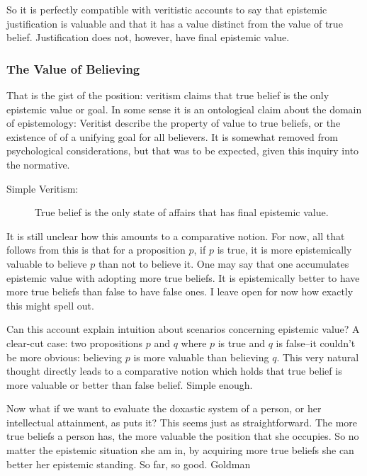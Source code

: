 \documentclass[12pt,numbers=noenddot]{scrartcl}
\begin{document}
So it is perfectly compatible with veritistic accounts to say that epistemic justification is valuable and that it has a value distinct from the value of true belief. Justification does not, however, have final epistemic value.

\subsubsection{The Value of Believing}
That is the gist of the position: veritism claims that true belief is the only epistemic value or goal. In some sense it is an ontological claim about the domain of epistemology: Veritist describe the property of value to true beliefs, or the existence of of a unifying goal for all believers. It is somewhat removed from psychological considerations, but that was to be expected, given this inquiry into the normative.

\begin{description}
    \item[Simple Veritism:] True belief is the only state of affairs that has final epistemic value.
\end{description}

It is still unclear how this amounts to a comparative notion. For now, all that follows from this is that for a proposition $p$, if $p$ is true, it is more epistemically valuable to believe $p$ than not to believe it. One may say that one accumulates epistemic value with adopting more true beliefs. It is epistemically better to have more true beliefs than false to have false ones. I leave open for now how exactly this might spell out.

Can this account explain intuition about scenarios concerning epistemic value?  A clear-cut case: two propositions $p$ and $q$ where $p$ is true and $q$ is false–it couldn't be more obvious: believing $p$ is more valuable than believing $q$. This very natural thought directly leads to a comparative notion which holds that true belief is more valuable or better than false belief. Simple enough.

Now what if we want to evaluate the doxastic system of a person, or her intellectual attainment, as \textcite[58]{Goldman2002-GOLTUO-2} puts it? This seems just as straightforward. The more true beliefs a person has, the more valuable the position that she occupies. So no matter the epistemic situation she am in, by acquiring more true beliefs she can better her epistemic standing. So far, so good. Goldman\textcite[59]{Goldman2002-GOLTUO-2}
\end{document}

